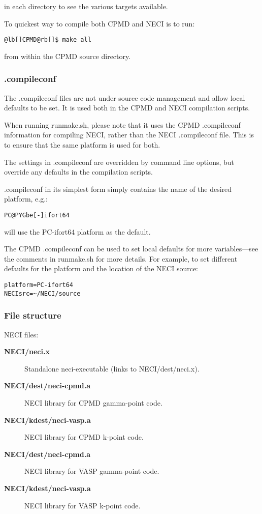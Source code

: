 \documentclass[openany,a4paper,10pt]{manual}
\begin{document}
in each directory to see the various targets available.

To quickest way to compile both CPMD and NECI is to run:

\begin{Verbatim}[commandchars=@\[\]]
@lb[]CPMD@rb[]$ make all
\end{Verbatim}

from within the CPMD source directory.


\subsubsection{.compileconf}

The .compileconf files are not under source code management and allow local defaults
to be set.  It is used both in the CPMD and NECI compilation scripts.

When running runmake.sh, please note that it uses the CPMD .compileconf information
for compiling NECI, rather than the NECI .compileconf file.  This is to ensure that
the same platform is used for both.

The settings in .compileconf are overridden by command line options, but override
any defaults in the compilation scripts.

.compileconf in its simplest form simply contains the name of the desired
platform, e.g.:

\begin{Verbatim}[commandchars=@\[\]]
PC@PYGbe[-]ifort64
\end{Verbatim}

will use the PC-ifort64 platform as the default.

The CPMD .compileconf can be used to set local defaults for more
variables---see the comments in runmake.sh for more details.  For example, to set
different defaults for the platform and the location of the NECI source:

\begin{Verbatim}[commandchars=@\[\]]
platform=PC-ifort64
NECIsrc=~/NECI/source
\end{Verbatim}


\subsubsection{File structure}

NECI files:
\begin{description}
\item[\textbf{NECI/neci.x}]
Standalone neci-executable (links to NECI/dest/neci.x).

\item[\textbf{NECI/dest/neci-cpmd.a}]
NECI library for CPMD gamma-point code.

\item[\textbf{NECI/kdest/neci-vasp.a}]
NECI library for CPMD k-point code.

\item[\textbf{NECI/dest/neci-cpmd.a}]
NECI library for VASP gamma-point code.

\item[\textbf{NECI/kdest/neci-vasp.a}]
NECI library for VASP k-point code.

\end{description}
\end{document}
